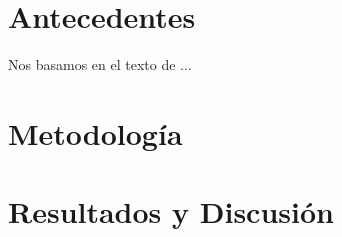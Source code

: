 \documentclass[final,5p,times,twocolumn,authoryear]{elsarticle}
\newcommand{\kms}{km\,s$^{-1}$}
\begin{document}
\section{Antecedentes}
\label{antecedentes}
Nos basamos en el texto de \cite{ackermann2009}...



\section{Metodología}
\label{metodología}


\section{Resultados y Discusión}
\label{resultados}




 







\end{document}

